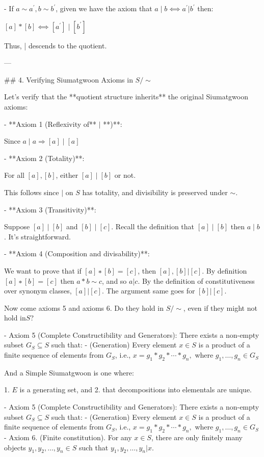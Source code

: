    - If $a\sim a^{'}, b \sim b^{'}$, given we have the axiom that  $a∣b  ⟺  a^{'}|b^{'}$ then:
    
    $[a]*[b] ⟺  [a^{'}]∣[b^{'}]$
    
    Thus, | descends to the quotient.
    
    ---
    
    ## 4. Verifying Siumatgwoon Axioms in $S/∼$
    
    Let’s verify that the **quotient structure inherits** the original Siumatgwoon axioms:
    
    - **Axiom 1 (Reflexivity of** $|$ **)**:
        
        Since $a∣a⇒[a]∣[a]$
        
    - **Axiom 2 (Totality)**:
        
        For all $[a],[b]$, either $[a]∣[b]$ or not.
        
        This follows since $|$ on $S$ has totality, and divisibility is preserved under $\sim$.
        
    - **Axiom 3 (Transitivity)**:
        
        Suppose $[a]∣[b]$ and  $[b]∣[c]$. Recall the definition that $[a]∣[b]$ then $a∣b$. It’s straightforward.
        
    - **Axiom 4 (Composition and divisability)**:
        
        We want to prove that if $[a]∗[b]=[c]$, then $[a],[b] | [c]$.  By definition $[a]∗[b]=[c]$ then $a*b\sim c$, and so $a|c$. By the definition of constitutiveness over synonym classes, $[a]|[c]$. The argument same goes for $[b]|[c]$.
        
        Now come axioms 5 and axioms 6. Do they hold in $S/ \sim$, even if they might not hold in$S$?
        
        - Axiom 5 (Complete Constructibility and Generators): There exists a non-empty subset $G_{S} \subseteq S$ such that:
            - (Generation) Every element $x \in S$ is a product of a finite sequence of elements from $G_S$, i.e., $x = g_1 * g_2 * \cdots * g_n,$  where $g_1, \dots, g_n \in G_S$
        
        And a Simple Siumatgwoon is one where:
        
        1. $E$ is a generating set, and 
        2. that decompositions into elementals are unique.
        
        - Axiom 5 (Complete Constructibility and Generators): There exists a non-empty subset $G_{S} \subseteq S$ such that:
            - (Generation) Every element $x \in S$ is a product of a finite sequence of elements from $G_S$, i.e., $x = g_1 * g_2 * \cdots * g_n,$  where $g_1, \dots, g_n \in G_S$
        - Axiom 6. (Finite constitution). For any $x \in S$, there are only finitely many objects $y_1, y_2, \ldots, y_n \in S$ such that  $y_1, y_2, \ldots, y_n | x.$
        
